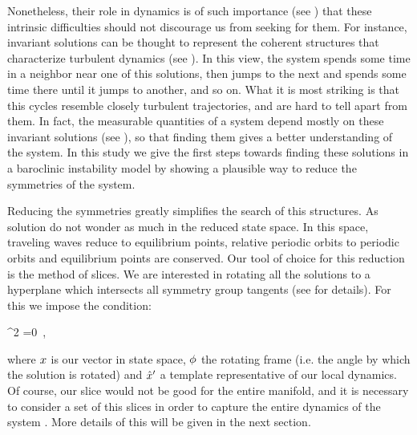 Nonetheless, their role in dynamics is of such importance (see
) that these intrinsic difficulties should not
discourage us from seeking for them. For instance, invariant solutions can be thought to represent
the coherent structures that characterize turbulent dynamics (see
). In this view, the system spends some
time in a neighbor near one of this solutions, then jumps to the next and
spends some time there until it jumps to another, and so on. What it is
most striking is that this cycles resemble closely turbulent
trajectories, and are hard to tell apart from them. In fact, the
measurable quantities of a system depend mostly on these invariant
solutions (see ), so that finding them gives a better
understanding of the system. In this study we give the first steps towards
finding these solutions in a baroclinic instability model by showing a plausible way to reduce the symmetries of the system.

Reducing the symmetries greatly simplifies the search of this structures. As solution do not
wonder as much in the reduced state space. In this space, traveling waves
reduce to equilibrium points, relative periodic orbits to periodic orbits and equilibrium points
are conserved. Our tool of choice for this reduction is the method of slices. We are interested
in rotating all the solutions to a hyperplane which intersects all symmetry group tangents (see  for details). For
this we impose the condition:

\beq
\frac{\partial}{\partial \gSpace} \norm{\ssp-\LieEl\slicep}^2 =0
\,,

where $x$ is our vector in state space, ${\bf \phi}$ the rotating frame (i.e. the angle by which the solution is rotated) and ${\hat{x}'}$ a template representative of our local dynamics. Of course, our slice would not be good for the entire manifold, and it is necessary to consider a set of this slices in order to capture the entire dynamics of the system . More details of this will be given in the next section.

